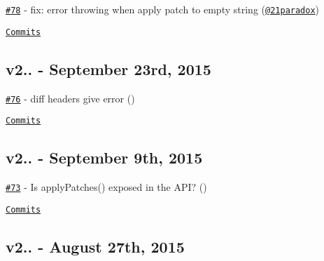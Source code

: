 \begin{DoxyItemize}
\item \href{https://github.com/kpdecker/jsdiff/pull/78}{\tt \#78} -\/ fix\+: error throwing when apply patch to empty string (\href{https://api.github.com/users/21paradox}{\tt @21paradox})
\end{DoxyItemize}

\href{https://github.com/kpdecker/jsdiff/compare/v2.1.2...v2.1.3}{\tt Commits}

\subsection*{v2.. -\/ September 23rd, 2015}


\begin{DoxyItemize}
\item \href{https://github.com/kpdecker/jsdiff/issues/76}{\tt \#76} -\/ diff headers give error (\href{https://api.github.com/users/piranna}{\tt })
\end{DoxyItemize}

\href{https://github.com/kpdecker/jsdiff/compare/v2.1.1...v2.1.2}{\tt Commits}

\subsection*{v2.. -\/ September 9th, 2015}


\begin{DoxyItemize}
\item \href{https://github.com/kpdecker/jsdiff/issues/73}{\tt \#73} -\/ Is apply\+Patches() exposed in the A\+PI? (\href{https://api.github.com/users/davidparsson}{\tt })
\end{DoxyItemize}

\href{https://github.com/kpdecker/jsdiff/compare/v2.1.0...v2.1.1}{\tt Commits}

\subsection*{v2.. -\/ August 27th, 2015}


